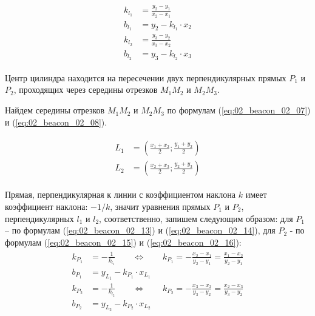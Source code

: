 \begin{eqnarray}
\begin{aligned}
k_{l_1} & = \frac{y_2-y_1}{x_2-x_1} 
\label{eq:02_beacon_02_09} \\
b_{l_1} &= y_2 - k_{l_1} \cdot x_2
\label{eq:02_beacon_02_10}\\
k_{l_2} &= \frac{y_3-y_2}{x_3-x_2}
\label{eq:02_beacon_02_11}\\
b_{l_2} &= y_3 - k_{l_2} \cdot x_3
\label{eq:02_beacon_02_12}
\end{aligned}
\end{eqnarray}


Центр цилиндра находится на пересечении двух перпендикулярных прямых $P_1$ и $P_2$, проходящих через середины отрезков $M_1M_2$ и $M_2M_3$. 

Найдем середины отрезков $M_1M_2$ и $M_2M_3$ по формулам (\ref{eq:02_beacon_02_07}) и (\ref{eq:02_beacon_02_08}).

\begin{eqnarray}
\begin{aligned}
L_1 &= \left( \frac{x_1+x_2}{2}; \frac{y_1+y_2}{2} \right)
\label{eq:02_beacon_02_07}\\
L_2 &= \left( \frac{x_2+x_3}{2}; \frac{y_2+y_3}{2} \right)
\label{eq:02_beacon_02_08}
\end{aligned}
\end{eqnarray}

Прямая, перпендикулярная к линии с коэффициентом наклона $k$ имеет коэффициент наклона: $-1/k$, значит уравнения прямых $P_1$ и $P_2$, перпендикулярных $l_1$ и $l_2$, соответственно, запишем следующим образом: 
для $P_1$ – по формулам (\ref{eq:02_beacon_02_13}) и (\ref{eq:02_beacon_02_14}), для $P_2$ - по формулам (\ref{eq:02_beacon_02_15}) и (\ref{eq:02_beacon_02_16}):
\begin{eqnarray}
\begin{aligned}
k_{P_1} &= -\frac{1}{k_{l_1}} \qquad \Leftrightarrow \qquad k_{P_1} = -\frac{x_2-x_1}{y_2-y_1} = \frac{x_1-x_2}{y_2-y_1}
\label{eq:02_beacon_02_13}\\
b_{P_1} &= y_{L_1} - k_{P_1} \cdot x_{L_1}
\label{eq:02_beacon_02_14}\\
k_{P_2} &= -\frac{1}{k_{l_2}} \qquad \Leftrightarrow \qquad k_{P_2} = -\frac{x_3 - x_2}{y_3-y_2} = \frac{x_2 - x_3}{y_3-y_2}
\label{eq:02_beacon_02_15}\\
b_{P_2} &= y_{L_2} - k_{P_2} \cdot x_{L_2}
\label{eq:02_beacon_02_16}
\end{aligned}
\end{eqnarray}

